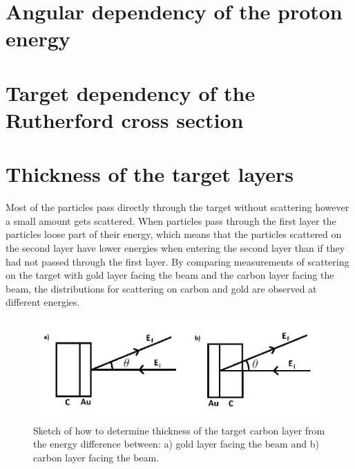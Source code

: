 \section{Angular dependency of the proton energy}

\section{Target dependency of the Rutherford cross section}

\section{Thickness of the target layers} 
Most of the particles pass directly through the target without scattering however a small amount gets scattered. When particles pass through the first layer the particles loose part of their energy, which means that the particles scattered on the second layer have lower energies when entering the second layer than if they had not passed through the first layer. By comparing measurements of scattering on the target with gold layer facing the beam and the carbon layer facing the beam, the distributions for scattering on carbon and gold are observed at different energies. 


\begin{figure}[h]
\centering
\includegraphics[width=0.99\columnwidth]{tykkelse.png}
\caption{Sketch of how to determine thickness of the target carbon layer from the energy difference between: a) gold layer facing the beam and b) carbon layer facing the beam.}
\label{fig_sketch_thickness}
\end{figure}


